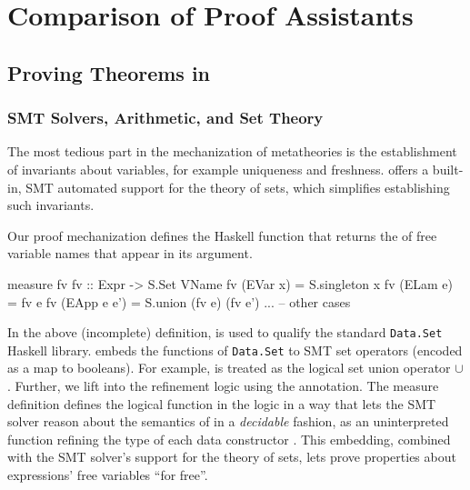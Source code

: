 \chapter{Comparison of Proof Assistants}

\section{Proving Theorems in \lh}

\subsection{SMT Solvers, Arithmetic, and Set Theory} \label{impl:settheory}

The most tedious part in the mechanization of metatheories
is the establishment of invariants about variables,
for example uniqueness and freshness.
%
\lh offers a built-in, SMT automated support for the
theory of sets, which simplifies establishing such
invariants.

\begin{fullversion}
  Our proof mechanization defines the Haskell function
   that returns the  of free variable names
  that appear in its argument.
  \begin{mcode}
  measure fv
  fv :: Expr -> S.Set VName
  fv (EVar x)    = S.singleton x
  fv (ELam e)    = fv e
  fv (EApp e e') = S.union (fv e) (fv e')
  ... -- other cases
  \end{mcode}
  In the above (incomplete) definition, 
  is used to qualify the standard \verb+Data.Set+ Haskell library.
  \lh embeds the functions of \verb+Data.Set+ to SMT
  set operators (encoded as a map to booleans).
  For example,  is treated as the
  logical set union operator $\cup$.
  Further, we lift  into the refinement
  logic using the  annotation.
  The measure definition  defines the logical
  function  in the logic in a way that
  lets the SMT solver reason about the semantics
  of  in a \textit{decidable} fashion,
  as an uninterpreted function refining the
  type of each  data constructor
  \cite{sprite}.
  This embedding, combined with the SMT solver's
  support for the theory of sets, lets \lh prove
  properties about expressions' free variables
  ``for free''.
\end{fullversion}

